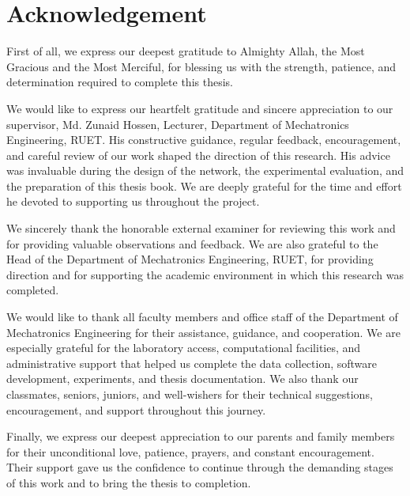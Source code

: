 \chapter*{Acknowledgement}

First of all, we express our deepest gratitude to Almighty Allah, the
Most Gracious and the Most Merciful, for blessing us with the strength,
patience, and determination required to complete this thesis.

We would like to express our heartfelt gratitude and sincere appreciation
to our supervisor, Md. Zunaid Hossen, Lecturer, Department of
Mechatronics Engineering, RUET. His constructive guidance, regular
feedback, encouragement, and careful review of our work shaped the
direction of this research. His advice was invaluable during the design
of the network, the experimental evaluation, and the preparation of this
thesis book. We are deeply grateful for the time and effort he devoted to
supporting us throughout the project.

We sincerely thank the honorable external examiner for reviewing this
work and for providing valuable observations and feedback. We are also
grateful to the Head of the Department of Mechatronics Engineering,
RUET, for providing direction and for supporting the academic environment
in which this research was completed.

We would like to thank all faculty members and office staff of the
Department of Mechatronics Engineering for their assistance, guidance,
and cooperation. We are especially grateful for the laboratory access,
computational facilities, and administrative support that helped us
complete the data collection, software development, experiments, and
thesis documentation. We also thank our classmates, seniors, juniors,
and well-wishers for their technical suggestions, encouragement, and
support throughout this journey.

Finally, we express our deepest appreciation to our parents and family
members for their unconditional love, patience, prayers, and constant
encouragement. Their support gave us the confidence to continue through
the demanding stages of this work and to bring the thesis to completion.

